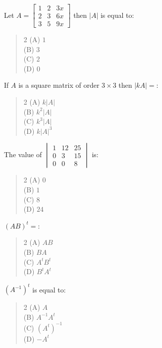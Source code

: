 \documentclass[11pt,a4paper]{article}
\begin{document}
\begin{mcqlist}
\item Let $A=\begin{bmatrix}1&2&3x\\2&3&6x\\3&5&9x\end{bmatrix}$ then $|A|$ is equal to:
\begin{quote}\begin{multicols}{2}
\noindent (A) $1$ \\
(B) $3$ \\
(C) $2$ \\
(D) $0$
\end{multicols}\end{quote}

\item If $A$ is a square matrix of order $3\times3$ then $|kA|=$:
\begin{quote}\begin{multicols}{2}
\noindent (A) $k|A|$ \\
(B) $k^2|A|$ \\
(C) $k^3|A|$ \\
(D) $k|A|^3$
\end{multicols}\end{quote}

\item The value of $\begin{vmatrix}1&12&25\\0&3&15\\0&0&8\end{vmatrix}$ is:
\begin{quote}\begin{multicols}{2}
\noindent (A) $0$ \\
(B) $1$ \\
(C) $8$ \\
(D) $24$
\end{multicols}\end{quote}

\item $(AB)^t=$:
\begin{quote}\begin{multicols}{2}
\noindent (A) $AB$ \\
(B) $BA$ \\
(C) $A^tB^t$ \\
(D) $B^tA^t$
\end{multicols}\end{quote}

\item $(A^{-1})^t$ is equal to:
\begin{quote}\begin{multicols}{2}
\noindent (A) $A$ \\
(B) $A^{-1}A^t$ \\
(C) $(A^t)^{-1}$ \\
(D) $-A^t$
\end{multicols}\end{quote}


\end{mcqlist}
\end{document}

